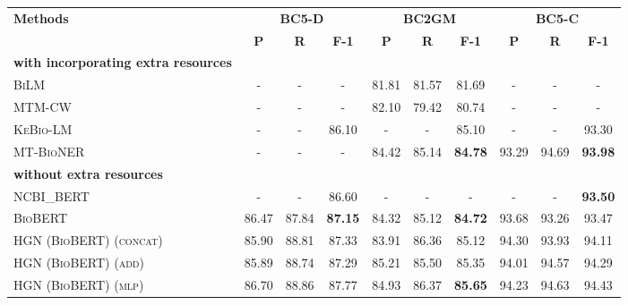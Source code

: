 \documentclass[11pt]{article}
\begin{document}
\begin{table*}[t]
\footnotesize
\centering
\begin{tabular}{lccccccccc}
\toprule[1pt]
\multicolumn{1}{l}{\multirow{2}{*}{\textbf{Methods}}} &\multicolumn{3}{c}{\textsc{\textbf{BC5-D}}}  & \multicolumn{3}{c}{\textsc{\textbf{BC2GM}}} & \multicolumn{3}{c}{\textsc{\textbf{BC5-C}}}\\ 
\cmidrule(l){2-4}
\cmidrule(l){5-7}
\cmidrule(l){8-10}
\multicolumn{1}{c}{}  & \textsc{\textbf{P}}        & \textsc{\textbf{R}}   & \textsc{\textbf{F-1}}& \textsc{\textbf{P}}     & \textsc{\textbf{R}} & \textsc{\textbf{F-1}}  
& \textsc{\textbf{P}} & \textsc{\textbf{R}} & \textsc{\textbf{F-1}}\\ 
\cmidrule(l){1-10}
\textbf{with incorporating extra resources} & &  & &  & &  &  & & \\
\textsc{BiLM} \cite{sachan2018effective} & {-} & {-} & {-}& {81.81} & {81.57}& {81.69}& {-} & {-} & {-}\\
\textsc{MTM-CW} \cite{wang2019cross} & {-} & {-} & {-}& {82.10} & {79.42}& {80.74}& {-} & {-} & {-}\\



\textsc{KeBio-LM} \cite{yuan2021improving} & {-} & {-} & {86.10}& {-} & {-}& {85.10}& {-} & {-} & {93.30}\\
\textsc{MT-BioNER} \cite{2021A} & {-} & {-} & {-}& {84.42} & {85.14}& \textbf{84.78}& {93.29} & {94.69} & \textbf{93.98}\\
\cmidrule(l){1-10}

\textbf{without extra resources} & &  & &  & &  &  & & \\
\textsc{NCBI\_BERT} \cite{peng2019transfer} & {-} & {-} & {86.60}& {-} & {-}& {-}& {-} & {-} & \textbf{93.50}\\
\textsc{BioBERT} \cite{biobert} & {86.47} & {87.84} & \textbf{87.15}& {84.32} & {85.12}& \textbf{84.72}& {93.68}& {93.26}& {93.47}\\
\cmidrule(l){1-10}
\textsc{HGN (BioBERT) (concat)} & {85.90} & {88.81}   & {87.33} & 
{83.91} & {86.36} & {85.12} & 
{94.30} & {93.93} & {94.11} \\

\textsc{HGN (BioBERT) (add)} & {85.89} & {88.74}   & {87.29} & 
{85.21} & {85.50} & {85.35} & 
{94.01} & {94.57} & {94.29} \\

\textsc{HGN (BioBERT) (mlp)} & {86.70} & {88.86}   & {87.77} & 
{84.93} & {86.37} & \textbf{85.65} & 
{94.23} & {94.63} & {94.43} \\


\end{tabular}
\end{table*}
\end{document}
